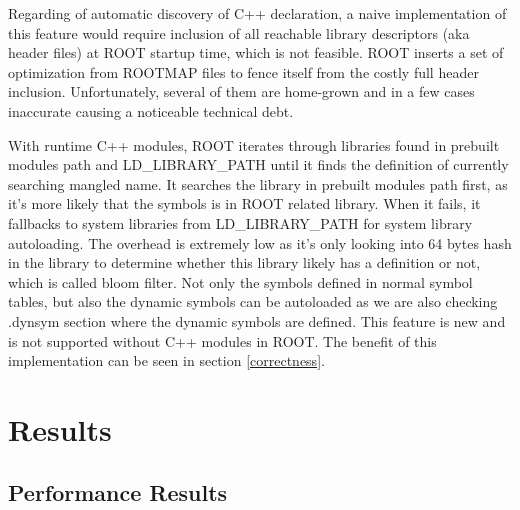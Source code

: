 \documentclass{webofc}
\begin{document}
Regarding of automatic discovery of C++ declaration, a naive implementation of this feature would require inclusion of all reachable library descriptors (aka header files) at ROOT startup time, which is not feasible. ROOT inserts a set of optimization from ROOTMAP files to fence itself from the costly full header inclusion. Unfortunately, several of them are home-grown and in a few cases inaccurate causing a noticeable technical debt.

With runtime C++ modules, ROOT iterates through libraries found in prebuilt modules path and LD\_LIBRARY\_PATH until it finds the definition of currently searching mangled name. It searches the library in prebuilt modules path first, as it's more likely that the symbols is in ROOT related library. When it fails, it fallbacks to system libraries from LD\_LIBRARY\_PATH for system library autoloading. The overhead is extremely low as it's only looking into 64 bytes hash in the library to determine whether this library likely has a definition or not, which is called bloom filter. Not only the symbols defined in normal symbol tables, but also the dynamic symbols can be autoloaded as we are also checking .dynsym section where the dynamic symbols are defined. This feature is new and is not supported without C++ modules in ROOT.
The benefit of this implementation can be seen in section \ref{correctness}.

\section{Results}
\label{results}


\subsection{Performance Results}
\label{performance}
\end{document}
